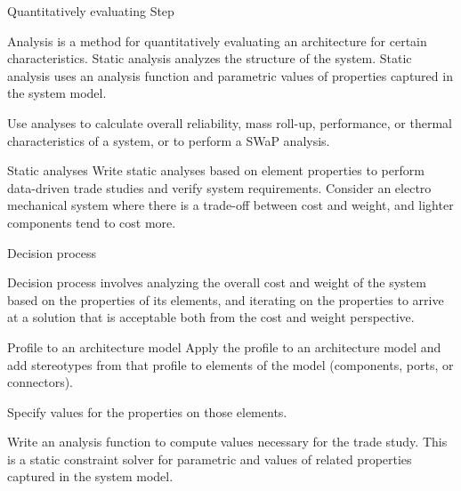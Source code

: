 \begin{frame}
\begin{block}{Quantitatively evaluating Step }

Analysis is a method for quantitatively evaluating an architecture for certain characteristics. Static analysis analyzes the structure of the system. Static analysis uses an analysis function and parametric values of properties captured in the system model.

Use analyses to calculate overall reliability, mass roll-up, performance, or thermal characteristics of a system, or to perform a SWaP analysis.
\end{block}
\end{frame}



\begin{frame}
\begin{block}{Static analyses}
Write static analyses based on element properties to perform data-driven trade studies and verify system requirements. Consider an electro mechanical system where there is a trade-off between cost and weight, and lighter components tend to cost more.

\end{block}
\end{frame}

\begin{frame}
\begin{block}{Decision process}

Decision process involves analyzing the overall cost and weight of the system based on the properties of its elements, and iterating on the properties to arrive at a solution that is acceptable both from the cost and weight perspective.
\end{block}
\end{frame}


\begin{frame}
\begin{block}{Profile to an architecture model }
Apply the profile to an architecture model and add stereotypes from that profile to elements of the model (components, ports, or connectors).

Specify values for the properties on those elements.

Write an analysis function to compute values necessary for the trade study. This is a static constraint solver for parametric and values of related properties captured in the system model.
\end{block}
\end{frame}



